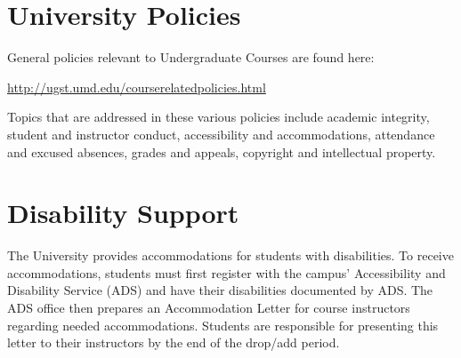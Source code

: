 \documentclass[a4paper,10pt]{article}
\begin{document}
\section{University Policies}
General policies relevant to Undergraduate Courses are found here:
\begin{center}
\url{http://ugst.umd.edu/courserelatedpolicies.html}
\end{center}
Topics that are addressed in these various policies include academic integrity, student and instructor conduct, accessibility and accommodations, attendance and excused absences, grades and appeals, copyright and intellectual property.

\section{Disability Support}
The University provides accommodations for students with disabilities. To receive accommodations, students must first register with the campus’ Accessibility and Disability Service (ADS) and have their disabilities documented by ADS. The ADS office then prepares an Accommodation Letter for course instructors regarding needed accommodations. Students are responsible for presenting this letter to their instructors by the end of the drop/add period.
\end{document}
